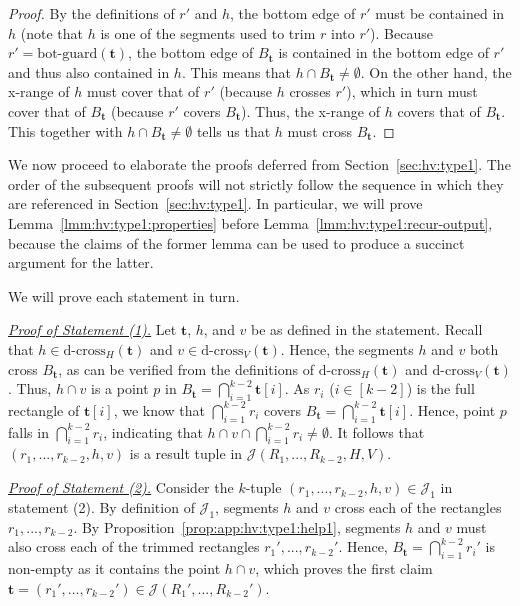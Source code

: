 \documentclass[acmsmall,review,anonymous]{acmart}
\def\vgap{\vspace{1mm}}
\def\extraspacing{\vspace{2mm} \noindent}
\def\J{\mathcal{J}}
\def\gbot{\mathrm{bot\text{-}guard}}
\def\dcross{\mathrm{d\text{-}cross}}
\begin{document}
{{{\begin{proof}
    \vgap

    By the definitions of $r'$ and $h$, the bottom edge of $r'$ must be contained in $h$ (note that $h$ is one of the segments used to trim $r$ into $r'$). Because $r' = \gbot(\bm{t})$, the bottom edge of $B_\bm{t}$ is contained in the bottom edge of $r'$ and thus also contained in $h$. This means that $h \cap B_{\bm{t}}\neq \emptyset$. On the other hand, the x-range of $h$ must cover that of $r'$ (because $h$ crosses $r'$), which in turn must cover that of $B_\bm{t}$ (because $r'$ covers $B_\bm{t}$). Thus, the x-range of $h$ covers that of $B_\bm{t}$. This together with $h \cap B_{\bm{t}}\neq \emptyset$ tells us that $h$ must cross $B_\bm{t}$.
\end{proof}

We now proceed to elaborate the proofs deferred from Section~\ref{sec:hv:type1}. The order of the subsequent proofs will not strictly follow the sequence in which they are referenced in Section~\ref{sec:hv:type1}. In particular, we will prove Lemma~\ref{lmm:hv:type1:properties} before Lemma~\ref{lmm:hv:type1:recur-output}, because the claims of the former lemma can be used to produce a succinct argument for the latter.

\extraspacing {\bf Proof of Lemma~\ref{lmm:hv:type1:properties}.} We will prove each statement in turn.

\extraspacing \underline{\em Proof of Statement (1).} Let $\bm{t}$, $h$, and $v$ be as defined in the statement. 
Recall that $h \in \dcross_H(\bm{t})$ and $v \in \dcross_V(\bm{t})$. Hence, the segments $h$ and $v$ both cross $B_\bm{t}$, as can be verified from the definitions of $\dcross_H(\bm{t})$ and $\dcross_V(\bm{t})$. Thus, $h \cap v$ is a point $p$ in $B_\bm{t} = \bigcap_{i=1}^{k-2} \bm{t}[i]$. As $r_i$ ($i \in [k-2]$) is the full rectangle of $\bm{t}[i]$, we know that $\bigcap_{i=1}^{k-2} r_i$ covers $B_\bm{t} = \bigcap_{i=1}^{k-2} \bm{t}[i]$. Hence, point $p$ falls in $\bigcap_{i=1}^{k-2} r_i$, indicating that $h\cap v \cap \bigcap_{i = 1}^{k-2}r_i \neq \emptyset$. It follows that $(r_1,...,r_{k-2},h,v)$ is a result tuple in $\J(R_1,...,R_{k-2},H,V)$.

\extraspacing \underline{\em Proof of Statement (2).} Consider the $k$-tuple $(r_1,...,r_{k-2},h,v) \in \J_1$ in statement (2). By definition of $\J_1$, segments $h$ and $v$ cross each of the rectangles $r_1,..., r_{k-2}$. By Proposition~\ref{prop:app:hv:type1:help1}, segments $h$ and $v$ must also cross each of the trimmed rectangles $r_1',..., r_{k-2}'$. Hence, $B_\bm{t} = \bigcap_{i = 1}^{k-2}r_i'$ is non-empty as it contains the point $h \cap v$, which proves the first claim $\bm{t} = (r_1', ..., r_{k-2}') \in \J(R_1',...,R_{k-2}')$.

}}}
\end{document}
